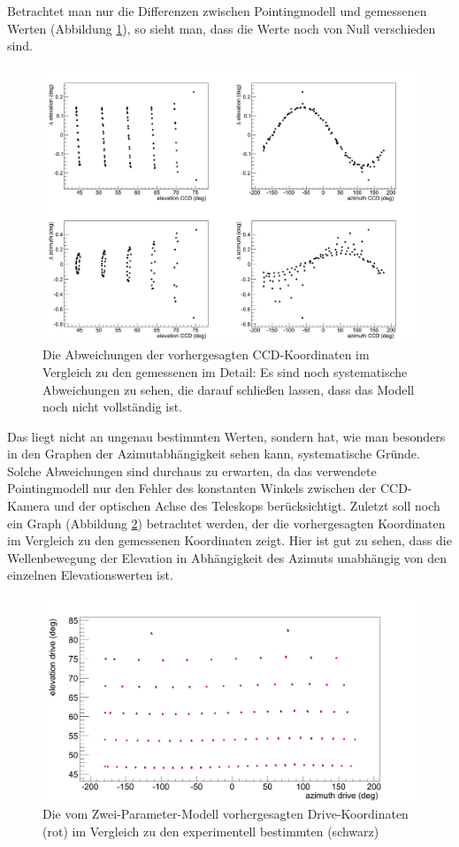 Betrachtet man nur die Differenzen zwischen Pointingmodell und gemessenen Werten (Abbildung \ref{img:C2D}), so sieht man, dass die Werte noch von Null verschieden sind.%
\begin{figure}[htbp]
\centering
\includegraphics[width=\textwidth]{../341/C2D.png}
\caption{Die Abweichungen der vorhergesagten CCD-Koordinaten im Vergleich zu den gemessenen im Detail: Es sind noch systematische Abweichungen zu sehen, die darauf schließen lassen, dass das Modell noch nicht vollständig ist.}
\label{img:C2D}
\end{figure}
Das liegt nicht an ungenau bestimmten Werten, sondern hat, wie man besonders in den Graphen der Azimutabhängigkeit sehen kann, systematische Gründe. Solche Abweichungen sind durchaus zu erwarten, da das verwendete Pointingmodell nur den Fehler des konstanten Winkels zwischen der CCD-Kamera und der optischen Achse des Teleskops berücksichtigt. Zuletzt soll noch ein Graph (Abbildung \ref{img:C2Dcomp2}) betrachtet werden, der die vorhergesagten Koordinaten im Vergleich zu den gemessenen Koordinaten zeigt. Hier ist gut zu sehen, dass die Wellenbewegung der Elevation in Abhängigkeit des Azimuts unabhängig von den einzelnen Elevationswerten ist.\newpage
\begin{figure}[htbp]
\centering
\includegraphics[width=\textwidth]{../341/C2Dcomp2.png}
\caption{Die vom Zwei-Parameter-Modell vorhergesagten Drive-Koordinaten (rot) im Vergleich zu den experimentell bestimmten (schwarz)}
\label{img:C2Dcomp2}
\end{figure}
